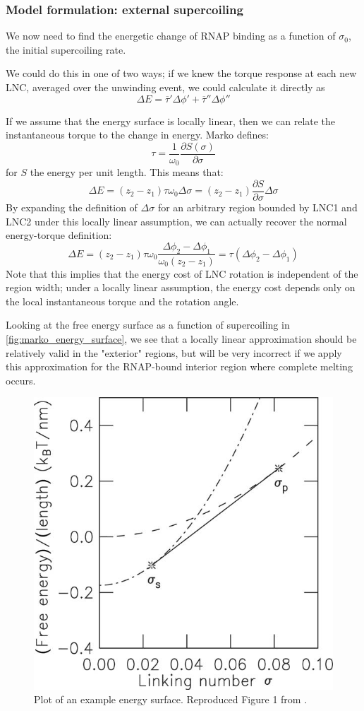 \documentclass[11pt]{article}
\begin{document}
\subsubsection{Model formulation: external supercoiling}
We now need to find the energetic change of RNAP binding as a function of \(\sigma_0\), the initial supercoiling rate.

We could do this in one of two ways; if we knew the torque response at each new LNC, averaged over the unwinding event, we could calculate it directly as
\begin{equation}
    \Delta E = \overline \tau' \Delta \phi' + \overline \tau'' \Delta \phi''
    \label{eq:direct_torque_calc}
\end{equation}

If we assume that the energy surface is locally linear, then we can relate the instantaneous torque to the change in energy. Marko defines:
\[ \tau = \frac{1}{\omega_0} \frac{\partial S(\sigma)}{\partial \sigma}\]
for \(S\) the energy per unit length. This means that:
\begin{equation}
    \Delta E = (z_2 - z_1) \tau \omega_0 \Delta \sigma = (z_2 - z_1) \frac{\partial S}{\partial \sigma} \Delta \sigma
\end{equation}
By expanding the definition of \(\Delta \sigma\) for an arbitrary region bounded by LNC1 and LNC2 under this locally linear assumption, we can actually recover the normal energy-torque definition:
\[\Delta E = (z_2 - z_1) \tau \omega_0 \frac{\Delta\phi_2 - \Delta\phi_1}{\omega_0 (z_2 - z_1)} = \tau (\Delta \phi_2 - \Delta\phi_1)\]
Note that this implies that the energy cost of LNC rotation is independent of the region width; under a locally linear assumption, the energy cost depends only on the local instantaneous torque and the rotation angle.

Looking at the free energy surface as a function of supercoiling in \autoref{fig:marko_energy_surface}, we see that a locally linear approximation should be relatively valid in the "exterior" regions, but will be very incorrect if we apply this approximation for the RNAP-bound interior region where complete melting occurs.

\begin{figure}[h]
    \centering
    \includegraphics[width=.5\linewidth]{figures/marko_linking_number_graph}
    \caption{Plot of an example energy surface. Reproduced Figure 1 from \textcite{markoTorqueDynamicsLinking2007}.}
    \label{fig:marko_energy_surface}
\end{figure}
\end{document}
